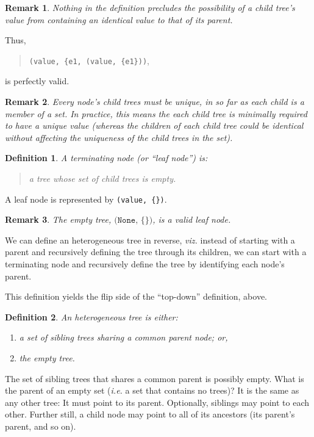 \documentclass[10pt]{amsart}
\numberwithin{equation}{section}
\newtheorem{defn}{Definition}[section]
\newtheorem{remark}{Remark}[section]
\begin{document}
\begin{remark}
Nothing in the definition precludes the possibility of a child tree's value from
containing an identical value to that of its parent.
\end{remark}

Thus,
\begin{quote}
\texttt{(value, \{e1, (value, \{e1\}))},
\end{quote}
is perfectly valid.

\begin{remark}
Every node's child trees must be unique, in so far as each child is a member of a
\emph{set}. In practice, this means the each child tree is minimally required to have
\emph{a unique value\/} (whereas the children of each child tree could be identical without
affecting the uniqueness of the child trees in the set).
\end{remark}

\begin{defn}
\label{defn:3}
A terminating node (or ``leaf node'') is:
    \begin{quote}
    a tree whose set of child trees is empty.
    \end{quote}
\end{defn}

A leaf node is represented by \texttt{(value, \{\})}.

\begin{remark}
The empty tree, $\texttt{(None, \{\})}$, is a valid leaf node.
\end{remark}

We can define an heterogeneous tree in reverse, \emph{viz.} instead of starting
with a parent and recursively defining the tree through its children, we
can start with a terminating node and recursively define the tree 
by identifying each node's parent. 

This definition yields the flip side of the ``top-down'' definition, above.

\begin{defn}
\label{defn:4}
An heterogeneous tree is either:
    \begin{enumerate}
        \item a set of sibling trees sharing a common parent node; or,
        \item the empty tree.
    \end{enumerate}
\end{defn}

The set of sibling trees that shares a common parent is possibly empty. What is
the parent of an empty set (\emph{i.e.} a set that contains no trees)? It is the same as 
any other tree: It must point to its parent. Optionally, siblings may point
to each other. Further still, a child node may point to all of its ancestors
(its parent's parent, and so on).
\end{document}
